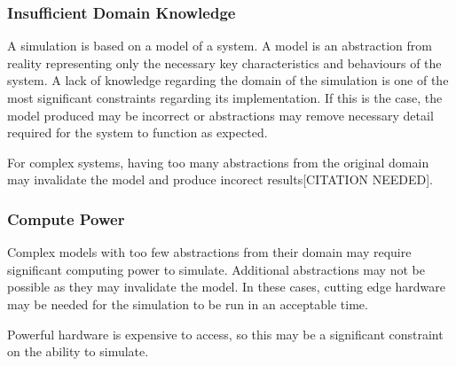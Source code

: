 \documentclass{UoYCSproject}
\begin{document}
\subsubsection{Insufficient Domain Knowledge}
\label{domain_knowledge}
A simulation is based on a model of a system. A model is an abstraction from reality representing only the necessary key characteristics and behaviours of the system. A lack of knowledge regarding the domain of the simulation is one of the most significant constraints regarding its implementation. If this is the case, the model produced may be incorrect or abstractions may remove necessary detail required for the system to function as expected.%

For complex systems, having too many abstractions from the original domain may invalidate the model and produce incorect results[CITATION NEEDED].

\subsubsection{Compute Power}
Complex models with too few abstractions from their domain may require significant computing power to simulate. Additional abstractions may not be possible as they may invalidate the model. In these cases, cutting edge hardware may be needed for the simulation to be run in an acceptable time. 


Powerful hardware is expensive to access, so this may be a significant constraint on the ability to simulate.



\end{document}
